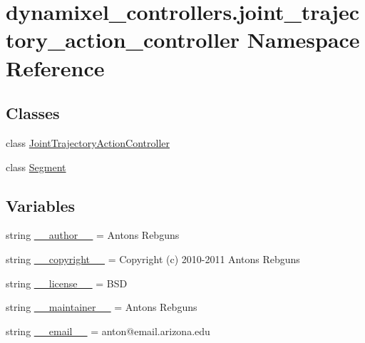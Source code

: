\hypertarget{namespacedynamixel__controllers_1_1joint__trajectory__action__controller}{}\section{dynamixel\+\_\+controllers.\+joint\+\_\+trajectory\+\_\+action\+\_\+controller Namespace Reference}
\label{namespacedynamixel__controllers_1_1joint__trajectory__action__controller}
\subsection*{Classes}
\begin{DoxyCompactItemize}
\item 
class \hyperlink{classdynamixel__controllers_1_1joint__trajectory__action__controller_1_1_joint_trajectory_action_controller}{Joint\+Trajectory\+Action\+Controller}
\item 
class \hyperlink{classdynamixel__controllers_1_1joint__trajectory__action__controller_1_1_segment}{Segment}
\end{DoxyCompactItemize}
\subsection*{Variables}
\begin{DoxyCompactItemize}
\item 
string \hyperlink{namespacedynamixel__controllers_1_1joint__trajectory__action__controller_af8d1738a41db5d893d278a262229b03c}{\+\_\+\+\_\+author\+\_\+\+\_\+} = \textquotesingle{}Antons Rebguns\textquotesingle{}
\item 
string \hyperlink{namespacedynamixel__controllers_1_1joint__trajectory__action__controller_aeae7eeed2e7bd1cf6e92d811d26a4a2a}{\+\_\+\+\_\+copyright\+\_\+\+\_\+} = \textquotesingle{}Copyright (c) 2010-\/2011 Antons Rebguns\textquotesingle{}
\item 
string \hyperlink{namespacedynamixel__controllers_1_1joint__trajectory__action__controller_a0e35f6facfef6dbd731f68a008ac5384}{\+\_\+\+\_\+license\+\_\+\+\_\+} = \textquotesingle{}B\+SD\textquotesingle{}
\item 
string \hyperlink{namespacedynamixel__controllers_1_1joint__trajectory__action__controller_a3922aa57cf5cd63b98f2dd2a5d551a7b}{\+\_\+\+\_\+maintainer\+\_\+\+\_\+} = \textquotesingle{}Antons Rebguns\textquotesingle{}
\item 
string \hyperlink{namespacedynamixel__controllers_1_1joint__trajectory__action__controller_a0109e32ba159f59c0c903bb74999c933}{\+\_\+\+\_\+email\+\_\+\+\_\+} = \textquotesingle{}anton@email.\+arizona.\+edu\textquotesingle{}
\end{DoxyCompactItemize}


